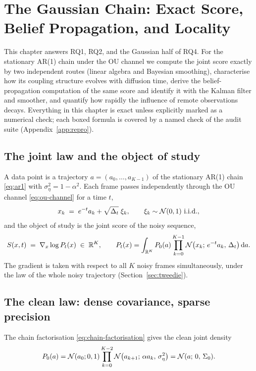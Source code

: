 \chapter{The Gaussian Chain: Exact Score, Belief Propagation, and
Locality}\label{ch:gaussian}

This chapter answers RQ1, RQ2, and the Gaussian half of RQ4. For the
stationary AR(1) chain under the OU channel we compute the joint score
exactly by two independent routes (linear algebra and Bayesian smoothing),
characterise how its coupling structure evolves with diffusion time,
derive the belief-propagation computation of the same score and identify
it with the Kalman filter and smoother, and quantify how rapidly the
influence of remote observations decays. Everything in this chapter is
exact unless explicitly marked as a numerical check; each boxed formula is
covered by a named check of the audit suite (Appendix~\ref{app:repro}).

\section{The joint law and the object of study}\label{sec:g-model}

A data point is a trajectory $a = (a_0, \dots, a_{K-1})$ of the stationary
AR(1) chain \eqref{eq:ar1} with $\sigma_\eta^2 = 1 - \alpha^2$. Each frame
passes independently through the OU channel \eqref{eq:ou-channel} for a
time $t$,
\begin{equation}
  x_k \;=\; e^{-t} a_k + \sqrt{\Delta_t}\;\xi_k,
  \qquad \xi_k \sim \mathcal{N}(0,1)\ \text{i.i.d.},
  \label{eq:g-channel}
\end{equation}
and the object of study is the joint score of the noisy sequence,
\begin{equation}
  S(x, t) \;=\; \nabla_x \log P_t(x) \;\in\; \mathbb{R}^K,
  \qquad
  P_t(x) = \int_{\mathbb{R}^K} P_0(a) \prod_{k=0}^{K-1}
    \mathcal{N}\big(x_k;\, e^{-t}a_k,\, \Delta_t\big)\, \mathrm{d} a .
  \label{eq:g-object}
\end{equation}
The gradient is taken with respect to all $K$ noisy frames simultaneously,
under the law of the whole noisy trajectory
(Section~\ref{sec:tweedie}).

\section{The clean law: dense covariance, sparse precision}
\label{sec:g-clean}

The chain factorisation \eqref{eq:chain-factorisation} gives the clean
joint density
\begin{equation}
  P_0(a)
  = \mathcal{N}(a_0; 0, 1) \prod_{k=0}^{K-2}
    \mathcal{N}\big(a_{k+1};\, \alpha a_k,\, \sigma_\eta^2\big)
  = \mathcal{N}(a;\, 0,\, \Sigma_0).
  \label{eq:g-P0}
\end{equation}

